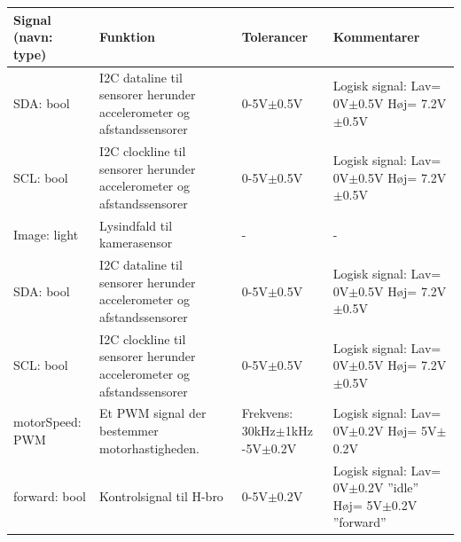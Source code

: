 \begin{table}[h]
	\centering
	\begin{tabularx}{\textwidth}{|l|X|X|X|} \hline
	\textbf{Signal (navn: type)} & \textbf{Funktion} & \textbf{Tolerancer} & \textbf{Kommentarer} \\ \hline
SDA: bool
	& I2C dataline til sensorer herunder accelerometer og afstandssensorer  
	& 0-5V$\pm$0.5V 
 	& Logisk signal: 			\newline
		Lav= 0V$\pm$0.5V  	\newline
		Høj= 7.2V$\pm$0.5V
	\\ \hline
	
SCL: bool
	& I2C clockline  til sensorer herunder accelerometer og afstandssensorer
	& 0-5V$\pm$0.5V
	& Logisk signal:			\newline 
		Lav= 0V$\pm$0.5V 	\newline
		Høj= 7.2V$\pm$0.5V
	\\ \hline
	
Image: light
	& Lysindfald til kamerasensor
	& -
	& -
	\\ \hline

SDA: bool
	& I2C dataline til sensorer herunder accelerometer og afstandssensorer   
	& 0-5V$\pm$0.5V 
 	& Logisk signal: 			\newline
		Lav= 0V$\pm$0.5V  	\newline
		Høj= 7.2V $\pm$0.5V
	\\ \hline
	
SCL: bool
	& I2C clockline  til sensorer herunder accelerometer og afstandssensorer
	& 0-5V$\pm$0.5V
	& Logisk signal:			\newline 
		Lav= 0V$\pm$0.5V 	\newline
		Høj= 7.2V$\pm$0.5V
	\\ \hline

motorSpeed: PWM	
	& Et PWM signal der bestemmer motorhastigheden.	
	& Frekvens: 30kHz$\pm$1kHz \newline
	  0-5V$\pm$0.2V	
	& Logisk signal: 			\newline 
		Lav= 0V$\pm$0.2V 	\newline
		Høj= 5V$\pm$0.2V
	\\ \hline
	
forward: bool	
	& Kontrolsignal til H-bro
	& 0-5V$\pm$0.2V
	& Logisk signal:					\newline 
		Lav= 0V$\pm$0.2V  ''idle''		\newline
		Høj= 5V$\pm$0.2V  ''forward''
	\\ \hline
	

\end{tabularx}
\end{table}
